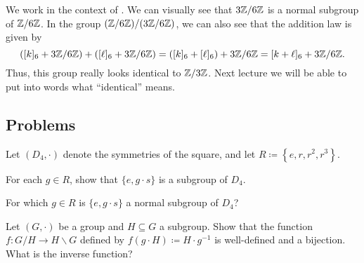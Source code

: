 \documentclass[../main.tex]{subfiles}
\begin{document}
\begin{example} \label{ex:double-quotient-is-z3z}
    We work in the context of . We can visually see that $3\mathbb Z/6\mathbb Z$ is a normal subgroup of $\mathbb Z/6\mathbb Z$. In the group $(\mathbb Z/6\mathbb Z)/(3\mathbb Z/6\mathbb Z)$, we can also see that the addition law is given by
    \[([k]_6+3\mathbb Z/6\mathbb Z)+([\ell]_6+3\mathbb Z/6\mathbb Z)=([k]_6+[\ell]_6)+3\mathbb Z/6\mathbb Z=[k+\ell]_6+3\mathbb Z/6\mathbb Z.\]
    Thus, this group really looks identical to $\mathbb Z/3\mathbb Z$. Next lecture we will be able to put into words what ``identical'' means.
\end{example}

\subsection{Problems}

\begin{homework}
    Let $(D_4,\cdot)$ denote the symmetries of the square, and let $R\coloneqq\left\{e,r,r^2,r^3\right\}$.
    \begin{listalph}
        \item For each $g\in R$, show that $\{e,g\cdot s\}$ is a subgroup of $D_4$.
        \item For which $g\in R$ is $\{e,g\cdot s\}$ a normal subgroup of $D_4$?
    \end{listalph}
\end{homework}

\begin{homework}
    Let $(G,\cdot)$ be a group and $H\subseteq G$ a subgroup. Show that the function $f\colon G/H\to H\backslash G$ defined by $f(g\cdot H)\coloneqq H\cdot g^{-1}$ is well-defined and a bijection. What is the inverse function?
\end{homework}

\end{document}
